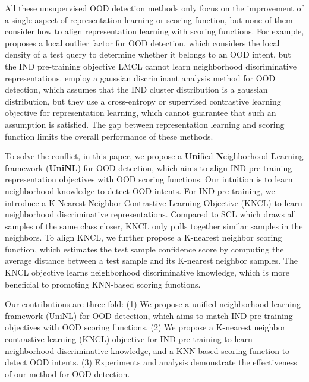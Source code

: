 \documentclass[11pt]{article}
\begin{document}
All these unsupervised OOD detection methods only focus on the improvement of a single aspect of representation learning or scoring function, but none of them consider how to align representation learning with scoring functions. For example,  proposes a local outlier factor for OOD detection, which considers the local density of a test query to determine whether it belongs to an OOD intent, but the IND pre-training objective LMCL \cite{wang2018cosface} cannot learn neighborhood discriminative representations.   employ a gaussian discriminant analysis method for OOD detection, which assumes that the IND cluster distribution is a gaussian distribution, but they use a cross-entropy or supervised contrastive learning \cite{Khosla2020SupervisedCL} objective for representation learning, which cannot guarantee that such an assumption is satisfied. The gap between representation learning and scoring function limits the overall performance of these methods. 


To solve the conflict, in this paper, we propose a \textbf{Uni}fied \textbf{N}eighborhood \textbf{L}earning framework (\textbf{UniNL}) for OOD detection, which aims to align IND pre-training representation objectives with OOD scoring functions. Our intuition is to learn neighborhood knowledge \cite{breunig2000lof} to detect OOD intents. For IND pre-training, we introduce a K-Nearest Neighbor Contrastive Learning Objective (KNCL) to learn neighborhood discriminative representations. Compared to SCL \cite{zeng-etal-2021-modeling} which draws all samples of the same class closer, KNCL only pulls together similar samples in the neighbors. To align KNCL, we further propose a K-nearest neighbor scoring function, which estimates the test sample confidence score by computing the average distance between a test sample and its K-nearest neighbor samples. The KNCL objective learns neighborhood discriminative knowledge, which is more beneficial to promoting KNN-based scoring functions.

Our contributions are three-fold: (1) We propose a unified neighborhood learning framework (UniNL) for OOD detection, which aims to match IND pre-training objectives with OOD scoring functions. (2) We propose a K-nearest neighbor contrastive learning (KNCL) objective for IND pre-training to learn neighborhood discriminative knowledge, and a KNN-based scoring function to detect OOD intents. (3) Experiments and analysis demonstrate the effectiveness of our method for OOD detection.
\end{document}
